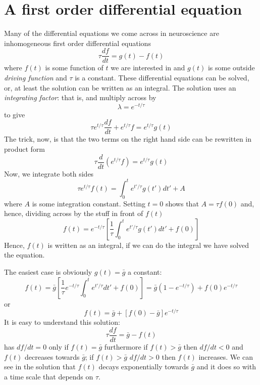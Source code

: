 \documentclass{article}
\begin{document}
\section*{A first order differential equation}
Many of the differential equations we come across in neuroscience are inhomogeneous first order differential equations
\begin{equation}
\tau\frac{df}{dt}=g(t)-f(t)
\end{equation}
where $f(t)$ is some function of $t$ we are interested in and $g(t)$ is some outside \textsl{driving function} and $\tau$ is a constant. These differential equations can be solved, or, at least the solution can be written as an integral. The solution uses an \textsl{integrating factor}: that is, 
and multiply across by
\begin{equation}
\lambda=e^{-t/\tau}
\end{equation}
to give
\begin{equation}
\tau e^{t/\tau}\frac{df}{dt}+e^{t/\tau}f=e^{t/\tau}g(t)
\end{equation}
The trick, now, is that the two terms on the right hand side can be rewritten in product form
\begin{equation}
\tau \frac{d}{dt}\left(e^{t/\tau}f\right)=e^{t/\tau}g(t)
\end{equation}
Now, we integrate both sides
\begin{equation}
\tau e^{t/\tau}f(t)=\int_0^t e^{t'/\tau} g(t')dt'+A
\end{equation}
where $A$ is some integration constant. Setting $t=0$ shows that $A=\tau f(0)$ and, hence, dividing across by the stuff in front of $f(t)$
\begin{equation}
f(t)=e^{-t/\tau}\left[\frac{1}{\tau}\int_0^t e^{t'/\tau} g(t')dt'+f(0)\right]
\end{equation}
Hence, $f(t)$ is written as an integral, if we can do the integral we have solved the equation.

The easiest case is obviously $g(t)=\bar{g}$ a constant:
\begin{equation}
f(t)= \bar{g} \left[\frac{1}{\tau}e^{-t/\tau}\int_0^t e^{t'/\tau}dt'+f(0)\right]=\bar{g}\left(1-e^{-t/\tau}\right) + f(0)e^{-t/\tau}
\end{equation}
or
\begin{equation}
f(t)=\bar{g}+[f(0)-\bar{g}]e^{-t/\tau}
\end{equation}
It is easy to understand this solution: 
\begin{equation}
\tau\frac{df}{dt}=\bar{g}-f(t)
\end{equation}
has $df/dt=0$ only if $f(t)=\bar{g}$ furthermore if $f(t)>\bar{g}$ then $df/dt<0$ and $f(t)$ decreases towards $\bar{g}$; if $f(t)>\bar{g}$  $df/dt>0$ then $f(t)$ increases. We can see in the solution that $f(t)$ decays exponentially towards $\bar{g}$ and it does so with a time scale that depends on $\tau$.
\end{document}
